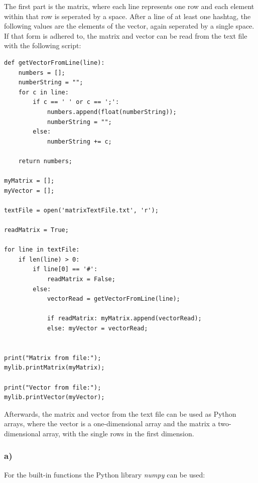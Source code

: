 The first part is the matrix, where each line represents one row and each element within that row is seperated by a space. After a line of at least one hashtag, the following values are the elements of the vector, again seperated by a single space. If that form is adhered to, the matrix and vector can be read from the text file with the following script:

\begin{lstlisting}[caption=Extracting the matrix and vector from the text file]
def getVectorFromLine(line):
	numbers = [];
	numberString = "";
	for c in line:
		if c == ' ' or c == ';':
			numbers.append(float(numberString));
			numberString = "";
		else:
			numberString += c;
	
	return numbers;

myMatrix = [];
myVector = [];

textFile = open('matrixTextFile.txt', 'r');

readMatrix = True;

for line in textFile:
	if len(line) > 0:
		if line[0] == '#':
			readMatrix = False;
		else:
			vectorRead = getVectorFromLine(line);
			
			if readMatrix: myMatrix.append(vectorRead);
			else: myVector = vectorRead;


print("Matrix from file:");
mylib.printMatrix(myMatrix);

print("Vector from file:");
mylib.printVector(myVector);
\end{lstlisting}

Afterwards, the matrix and vector from the text file can be used as Python arrays, where the vector is a one-dimensional array and the matrix a two-dimensional array, with the single rows in the first dimension.


\subsubsection{a)}

For the built-in functions the Python library \textit{numpy} can be used:


